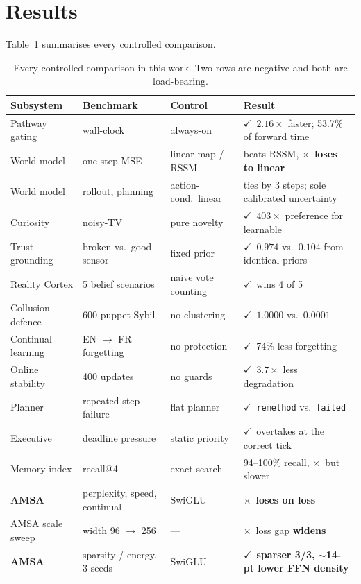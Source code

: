 \documentclass[10pt,twocolumn]{article}
\newcommand{\win}{\textbf{$\checkmark$}}
\newcommand{\lose}{$\times$}
\begin{document}
\section{Results}
\label{sec:results}

Table~\ref{tab:summary} summarises every controlled comparison.

\begin{table}[t]
\centering\small
\begin{tabular}{@{}llll@{}}
\toprule
\textbf{Subsystem} & \textbf{Benchmark} & \textbf{Control} & \textbf{Result} \\
\midrule
Pathway gating & wall-clock & always-on & \win\ $2.16\times$ faster; 53.7\% of forward time \\
World model & one-step MSE & linear map / RSSM & beats RSSM, \lose\ \textbf{loses to linear} \\
World model & rollout, planning & action-cond.\ linear & ties by 3 steps; sole calibrated uncertainty \\
Curiosity & noisy-TV & pure novelty & \win\ $403\times$ preference for learnable \\
Trust grounding & broken vs.\ good sensor & fixed prior & \win\ $0.974$ vs.\ $0.104$ from identical priors \\
Reality Cortex & 5 belief scenarios & naive vote counting & \win\ wins 4 of 5 \\
Collusion defence & 600-puppet Sybil & no clustering & \win\ $1.0000$ vs.\ $0.0001$ \\
Continual learning & EN $\rightarrow$ FR forgetting & no protection & \win\ 74\% less forgetting \\
Online stability & 400 updates & no guards & \win\ $3.7\times$ less degradation \\
Planner & repeated step failure & flat planner & \win\ \texttt{remethod} vs.\ \texttt{failed} \\
Executive & deadline pressure & static priority & \win\ overtakes at the correct tick \\
Memory index & recall@4 & exact search & 94--100\% recall, \lose\ but slower \\
\textbf{AMSA} & perplexity, speed, continual & SwiGLU & \lose\ \textbf{loses on loss} \\
AMSA scale sweep & width 96 $\rightarrow$ 256 & --- & \lose\ loss gap \textbf{widens} \\
\textbf{AMSA} & sparsity / energy, 3 seeds & SwiGLU & \win\ \textbf{sparser 3/3, $\sim$14-pt lower FFN density} \\
\bottomrule
\end{tabular}
\caption{Every controlled comparison in this work. Two rows are negative and
both are load-bearing.}
\label{tab:summary}
\end{table}
\end{document}
